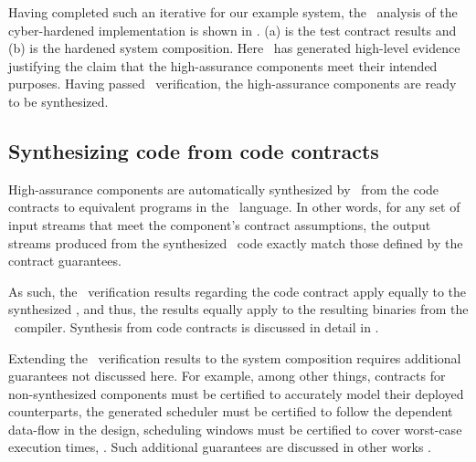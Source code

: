 Having completed such an iterative for our example system, 
the \agr\ analysis of the cyber-hardened implementation is shown in
.
(a) is the test contract results and (b) is the hardened system composition.
Here \agr\ has generated high-level
evidence justifying the claim that the high-assurance components meet their intended purposes.
Having passed \agr\ verification, the high-assurance components are ready to be
synthesized.


\subsection{Synthesizing code from code contracts}

High-assurance components are automatically synthesized by \splt\ from
the code contracts to equivalent programs in the \ckml\ language.  In
other words, for any set of input streams that meet the component's
contract assumptions, the output streams produced from the synthesized
\ckml\ code exactly match those defined by the contract guarantees.

As such, the \agr\ verification results regarding the code contract
apply equally to the synthesized \ckml, and thus, the results equally
apply to the resulting binaries from the \ckml\ compiler.  Synthesis
from code contracts is discussed in detail in .

Extending the \agr\ verification results to the system composition
requires additional guarantees not discussed here.  For
example, among other things, contracts for non-synthesized components
must be certified to accurately model their deployed counterparts, the
generated scheduler must be certified to follow the dependent
data-flow in the design, scheduling windows must be certified to cover
worst-case execution times, \etc.  Such additional guarantees are
discussed in other works \cite{gearcase2020, dcrypps2019,
  10.1007/978-3-030-89159-6_18, 10.1007/978-3-030-89159-6_17,
  sel4-2009, nfm:agree, 9734792}.

